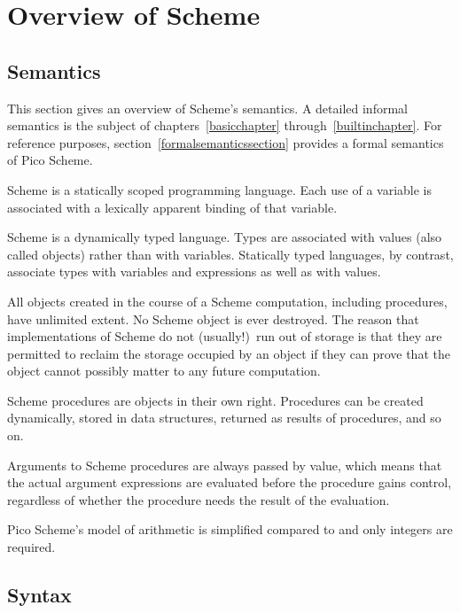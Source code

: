 
\chapter{Overview of Scheme}

\section{Semantics}
\label{semanticsection}

This section gives an overview of Scheme's semantics.  A
detailed informal semantics is the subject of
chapters~\ref{basicchapter} through~\ref{builtinchapter}.  For reference
purposes, section~\ref{formalsemanticssection} provides a formal
semantics of Pico Scheme.

\vest Scheme is a statically scoped programming
language.  Each use of a variable is associated with a lexically
apparent binding of that variable.

\vest Scheme is a dynamically typed language.  Types
are associated with values (also called objects) rather than
with variables.  
Statically typed languages, by contrast, associate types with
variables and expressions as well as with values.

\vest All objects created in the course of a Scheme computation, including
procedures, have unlimited extent.
No Scheme object is ever destroyed.  The reason that
implementations of Scheme do not (usually!)\ run out of storage is that
they are permitted to reclaim the storage occupied by an object if
they can prove that the object cannot possibly matter to any future
computation.

\vest Scheme procedures are objects in their own right.  Procedures can be
created dynamically, stored in data structures, returned as results of
procedures, and so on.

\vest Arguments to Scheme procedures are always passed by value, which
means that the actual argument expressions are evaluated before the
procedure gains control, regardless of whether the procedure needs the
result of the evaluation.

\vest Pico Scheme's model of arithmetic is simplified compared to
\rsevenrs{} and only integers are required.

\section{Syntax}

